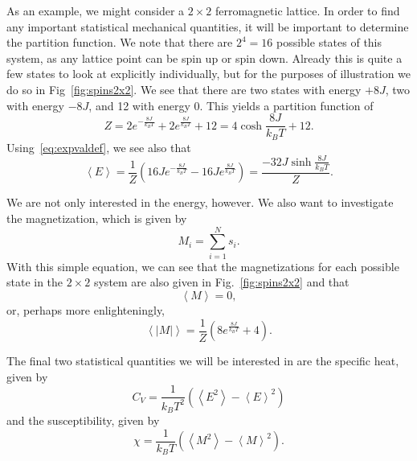 \documentclass[12pt]{article}
\numberwithin{equation}{section}
\begin{document}
\par As an example, we might consider a $2\times2$ ferromagnetic lattice.  In order to find any important statistical mechanical quantities, it will be important to determine the partition function.  We note that there are $2^{4}=16$ possible states of this system, as any lattice point can be spin up or spin down.  Already this is quite a few states to look at explicitly individually, but for the purposes of illustration we do so in Fig~\ref{fig:spins2x2}.  We see that there are two states with energy $+8J$, two with energy $-8J$, and 12 with energy $0$.  This yields a partition function of
\begin{equation}
\label{eq:partition2x2}
Z=2e^{-\frac{8J}{k_{B}T}}+2e^{\frac{8J}{k_{B}T}}+12 = 4\cosh{\frac{8J}{k_{B}T}}+12.
\end{equation}
Using~\eqref{eq:expvaldef}, we see also that
\begin{equation}
\label{eq:expe2x2}
\left<E\right> = \frac{1}{Z}\left(16Je^{-\frac{8J}{k_{B}T}}-16Je^{\frac{8J}{k_{B}T}}\right) = \frac{-32J\sinh{\frac{8J}{k_{B}T}}}{Z}.
\end{equation}
\par We are not only interested in the energy, however.  We also want to investigate the magnetization, which is given by
\begin{equation}
\label{eq:mag}
M_{i}=\sum_{i=1}^{N}s_{i}.
\end{equation}
With this simple equation, we can see that the magnetizations for each possible state in the $2\times2$ system are also given in Fig.~\ref{fig:spins2x2} and that
\begin{equation}
\label{eq:expm2x2}
\left<M\right>=0,
\end{equation}
or, perhaps more enlighteningly,
\begin{equation}
\label{eq:expabsm2x2}
\left<\left|M\right|\right> = \frac{1}{Z}\left(8e^{\frac{8J}{k_{B}T}}+4\right).
\end{equation}
\par The final two statistical quantities we will be interested in are the specific heat, given by
\begin{equation}
\label{eq:cvdef}
C_{V} = \frac{1}{k_{B}T^{2}}\left(\left<E^{2}\right>-\left<E\right>^{2}\right)
\end{equation}
and the susceptibility, given by
\begin{equation}
\label{eq:chidef}
\chi = \frac{1}{k_{B}T}\left(\left<M^{2}\right>-\left<M\right>^{2}\right).
\end{equation}
\end{document}
